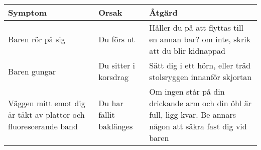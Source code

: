 \begin{adjustbox}{angle=-90}
  \begin{tabular}{|p{0.3\textheight}|p{0.3\textheight}|p{0.3\textheight}|}
    \hline
    \textbf{Symptom} & \textbf{Orsak} & \textbf{Åtgärd} \\
    \hline
    Baren rör på sig &
    Du förs ut &
    Håller du på att flyttas till en annan bar? om inte, skrik att du blir kidnappad \\
    \hline
    Baren gungar &
    Du sitter i korsdrag &
    Sätt dig i ett hörn, eller träd stolsryggen innanför skjortan \\
    \hline
    Väggen mitt emot dig är täkt av plattor och fluorescerande band &
    Du har fallit baklänges &
    Om ingen står på din drickande arm och din öhl är full, ligg kvar. Be annars någon att säkra fast dig vid baren \\
    \hline
  \end{tabular}
\end{adjustbox}



